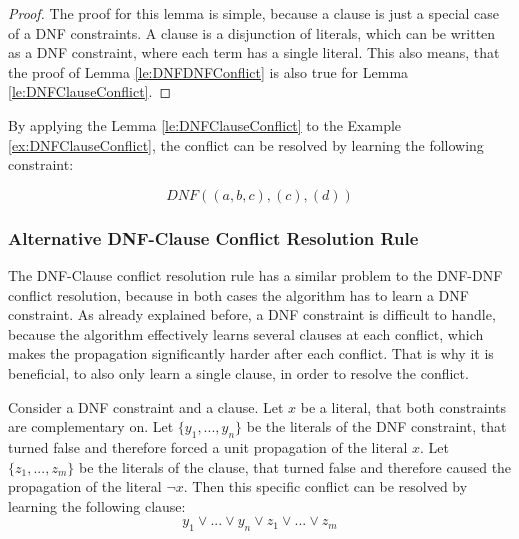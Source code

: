 \begin{proof}
The proof for this lemma is simple, because a clause is just a special case of a DNF constraints. A clause is a disjunction of literals, which can be written as a DNF constraint, where each term has a single literal. This also means, that the proof of Lemma \ref{le:DNFDNFConflict} is also true for Lemma \ref{le:DNFClauseConflict}.
\end{proof}

By applying the Lemma \ref{le:DNFClauseConflict} to the Example \ref{ex:DNFClauseConflict}, the conflict can be resolved by learning the following constraint:

\begin{leftbar}
\begin{displaymath}
DNF((a,b,c),(c),(d))
\end{displaymath}
\end{leftbar}

\subsubsection{Alternative DNF-Clause Conflict Resolution Rule}

The DNF-Clause conflict resolution rule has a similar problem to the DNF-DNF conflict resolution, because in both cases the algorithm has to learn a DNF constraint. As already explained before, a DNF constraint is difficult to handle, because the algorithm effectively learns several clauses at each conflict, which makes the propagation significantly harder after each conflict. That is why it is beneficial, to also only learn a single clause, in order to resolve the conflict.

\begin{lemma}
\begin{leftbar}
Consider a DNF constraint and a clause. Let $x$ be a literal, that both constraints are complementary on. Let $\{y_1,...,y_n\}$ be the literals of the DNF constraint, that turned false and therefore forced a unit propagation of the literal $x$. Let $\{z_1,...,z_m\}$ be the literals of the clause, that turned false and therefore caused the propagation of the literal $\neg x$. Then this specific conflict can be resolved by learning the following clause:
\begin{displaymath}
y_1 \vee ... \vee y_n \vee z_1 \vee ... \vee z_m
\end{displaymath}
\end{leftbar}
\label{le:DNFClauseConflictAlt}
\end{lemma}


